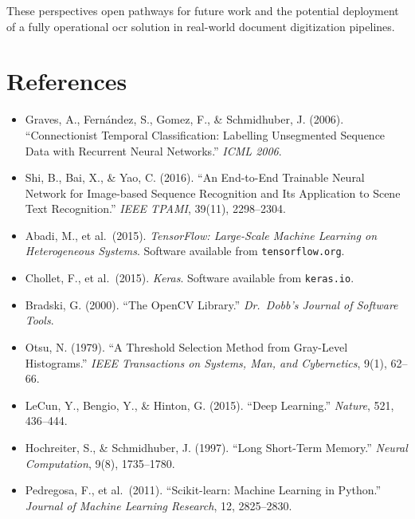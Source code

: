 \documentclass[a4paper, oneside, 12pt, final]{extreport}
\begin{document}
These perspectives open pathways for future work and the potential deployment of a
fully operational \gls{ocr} solution in real-world document digitization pipelines.

\chapter*{References}

\begin{itemize}
\item Graves, A., Fernández, S., Gomez, F., \& Schmidhuber, J. (2006).
``Connectionist Temporal Classification: Labelling Unsegmented Sequence Data
with Recurrent Neural Networks.'' \textit{ICML 2006}.

\item Shi, B., Bai, X., \& Yao, C. (2016).
``An End-to-End Trainable Neural Network for Image-based Sequence Recognition
and Its Application to Scene Text Recognition.''
\textit{IEEE TPAMI}, 39(11), 2298--2304.

\item Abadi, M., et al.\ (2015).
\textit{TensorFlow: Large-Scale Machine Learning on Heterogeneous Systems}.
Software available from \texttt{tensorflow.org}.

\item Chollet, F., et al.\ (2015).
\textit{Keras}. Software available from \texttt{keras.io}.

\item Bradski, G. (2000).
``The OpenCV Library.'' \textit{Dr.\ Dobb's Journal of Software Tools}.

\item Otsu, N. (1979).
``A Threshold Selection Method from Gray-Level Histograms.''
\textit{IEEE Transactions on Systems, Man, and Cybernetics}, 9(1), 62--66.

\item LeCun, Y., Bengio, Y., \& Hinton, G. (2015).
``Deep Learning.'' \textit{Nature}, 521, 436--444.

\item Hochreiter, S., \& Schmidhuber, J. (1997).
``Long Short-Term Memory.'' \textit{Neural Computation}, 9(8), 1735--1780.

\item Pedregosa, F., et al.\ (2011).
``Scikit-learn: Machine Learning in Python.''
\textit{Journal of Machine Learning Research}, 12, 2825--2830.
\end{itemize}

\cleardoublepage
\printindex


\end{document}
